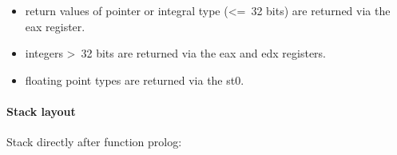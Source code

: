 \begin{itemize}
\item return values of pointer or integral type (\textless=\ 32 bits) are returned via the eax register.
\item integers \textgreater\ 32 bits are returned via the eax and edx registers.
\item floating point types are returned via the st0.
\end{itemize}


\pagebreak

\paragraph{Stack layout}

Stack directly after function prolog:\\


